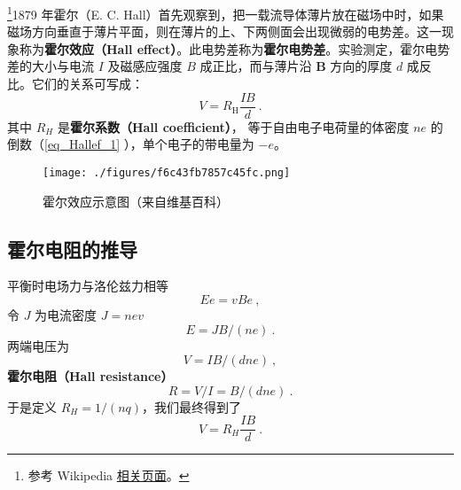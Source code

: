 

\footnote{参考 Wikipedia \href{https://en.wikipedia.org/wiki/Hall_effect}{相关页面}。}1879 年霍尔（E. C. Hall）首先观察到，把一载流导体薄片放在磁场中时，如果磁场方向垂直于薄片平面，则在薄片的上、下两侧面会出现微弱的电势差。这一现象称为\textbf{霍尔效应（Hall effect）}。此电势差称为\textbf{霍尔电势差}。实验测定，霍尔电势差的大小与电流 $I$ 及磁感应强度 $B$ 成正比，而与薄片沿 $\mathbf B$ 方向的厚度 $d$ 成反比。它们的关系可写成：
\begin{equation}
V = R_{\mathrm{H}} \frac{I B}{d}~.
\end{equation}
其中 $R_H$ 是\textbf{霍尔系数（Hall coefficient）}， 等于自由电子电荷量的体密度 $ne$ 的倒数（\autoref{eq_Hallef_1} ），单个电子的带电量为 $-e$。

\begin{figure}[ht]
\centering
\texttt{[image: ./figures/f6c43fb7857c45fc.png]}
\caption{霍尔效应示意图（来自维基百科）} \label{fig_Hallef_1}
\end{figure}

\subsection{霍尔电阻的推导}
平衡时电场力与洛伦兹力相等
\begin{equation}
Ee = vBe~,
\end{equation}
令 $J$ 为电流密度 $J=nev$
\begin{equation}
E = JB/(ne)~.
\end{equation}
两端电压为
\begin{equation}\label{eq_Hallef_1}
V = IB/(d n e)~,
\end{equation}
\textbf{霍尔电阻（Hall resistance）}
\begin{equation}\label{eq_Hallef_2}
R = V/I = B/(d n e)~.
\end{equation}
于是定义 $R_H=1/(nq)$，我们最终得到了
\begin{equation}
V=R_H\frac{IB}{d}~.
\end{equation}

